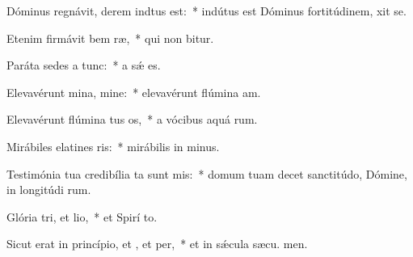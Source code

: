 \item Dóminus regnávit, derem indtus est:~* indútus est Dóminus fortitúdinem,  xit se.
\item Etenim firmávit bem ræ,~* qui non bitur.
\item Paráta sedes a  tunc:~* a sǽ  es.
\item Elevavérunt mina, mine:~* elevavérunt flúmina  am.
\item Elevavérunt flúmina tus os,~* a vócibus aquá rum.
\item Mirábiles elatines ris:~* mirábilis in  minus.
\item Testimónia tua credibília ta sunt mis:~* domum tuam decet sanctitúdo, Dómine, in longitúdi rum.
\item Glória tri, et lio,~* et Spirí to.
\item Sicut erat in princípio, et , et per,~* et in sǽcula sæcu. men.
